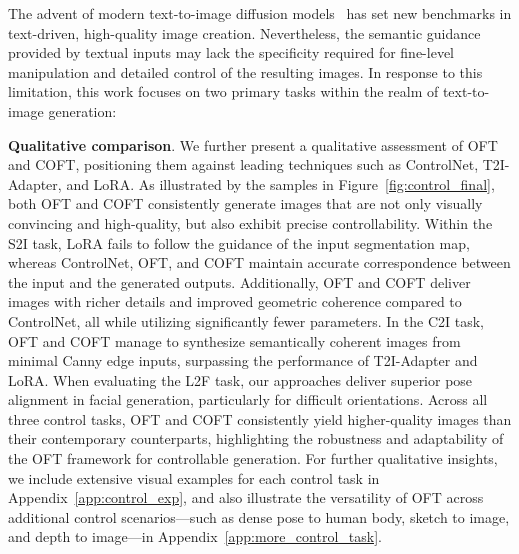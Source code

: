\begin{itemize}[leftmargin=*,nosep]
The advent of modern text-to-image diffusion models~\cite{saharia2022photorealistic,ramesh2022hierarchical,rombach2022high} has set new benchmarks in text-driven, high-quality image creation. Nevertheless, the semantic guidance provided by textual inputs may lack the specificity required for fine-level manipulation and detailed control of the resulting images. In response to this limitation, this work focuses on two primary tasks within the realm of text-to-image generation:

\textbf{Qualitative comparison}. We further present a qualitative assessment of OFT and COFT, positioning them against leading techniques such as ControlNet, T2I-Adapter, and LoRA. As illustrated by the samples in Figure~\ref{fig:control_final}, both OFT and COFT consistently generate images that are not only visually convincing and high-quality, but also exhibit precise controllability. Within the S2I task, LoRA fails to follow the guidance of the input segmentation map, whereas ControlNet, OFT, and COFT maintain accurate correspondence between the input and the generated outputs. Additionally, OFT and COFT deliver images with richer details and improved geometric coherence compared to ControlNet, all while utilizing significantly fewer parameters. In the C2I task, OFT and COFT manage to synthesize semantically coherent images from minimal Canny edge inputs, surpassing the performance of T2I-Adapter and LoRA. When evaluating the L2F task, our approaches deliver superior pose alignment in facial generation, particularly for difficult orientations. Across all three control tasks, OFT and COFT consistently yield higher-quality images than their contemporary counterparts, highlighting the robustness and adaptability of the OFT framework for controllable generation. For further qualitative insights, we include extensive visual examples for each control task in Appendix~\ref{app:control_exp}, and also illustrate the versatility of OFT across additional control scenarios—such as dense pose to human body, sketch to image, and depth to image—in Appendix~\ref{app:more_control_task}.



\end{itemize}
